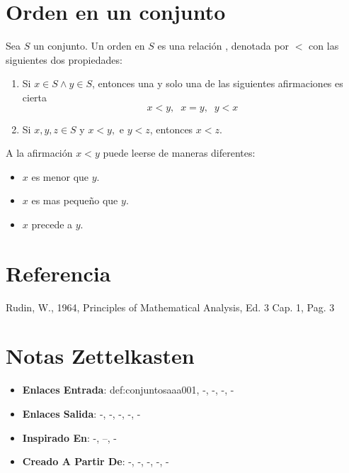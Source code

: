\documentclass[12pt]{article}
\begin{document}
\section*{Orden en un conjunto}

\begin{definition}
Sea $S$ un conjunto. Un orden en $S$ es una relación , denotada por $<$ con las siguientes dos propiedades:
\begin{enumerate}
\item Si $x \in S \land y \in S$, entonces una y solo una de las siguientes afirmaciones es cierta
\[x < y, \;\; x = y, \;\; y < x \]
\item Si $x, y, z \in S$ y $x < y,$ e  $y < z$, entonces $x < z$.
\end{enumerate}
A la afirmación $x < y$ puede leerse de maneras diferentes: 
\begin{itemize}
\item $x$ es menor que $y$.
\item $x$ es mas pequeño que $y$.
\item $x$ precede a $y$.
\end{itemize}
\end{definition}

\section*{Referencia}
Rudin, W., 1964, Principles of Mathematical Analysis, Ed. 3 Cap. 1, Pag. 3 

\section*{Notas Zettelkasten}
\begin{itemize}
  \item \textbf{Enlaces Entrada}: def:conjuntosaaa001, -, -, -, -
  \item \textbf{Enlaces Salida}: -, -, -, -, -
  \item \textbf{Inspirado En}: -, --, -
  \item \textbf{Creado A Partir De}: -, -, -, -, -
\end{itemize}
\end{document}
